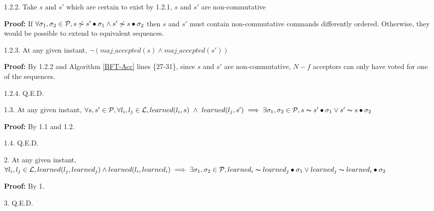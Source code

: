 \indent\indent\indent\indent\indent\parbox{\linewidth-\algorithmicindent*5}{\strut1.2.2. Take $s$ and $s'$ which are certain to exist by 1.2.1, $s$ and $s'$ are non-commutative }\par
\indent\indent\indent\indent\indent\indent\parbox{\linewidth-\algorithmicindent*6}{\strut\textbf{Proof:} If $\forall \sigma_1,\sigma_2 \in \mathcal{P}, s \not\thicksim s' \bullet \sigma_1 \land s' \not\thicksim s \bullet \sigma_2$ then $s$ and $s'$ must contain non-commutative commands differently ordered. Otherwise, they would be possible to extend to equivalent sequences.}\par
\indent\indent\indent\indent\indent\parbox{\linewidth}{\strut1.2.3. At any given instant, $\neg (maj\_accepted(s) \land maj\_accepted(s'))$ } \par
\indent\indent\indent\indent\indent\indent\parbox{\linewidth-\algorithmicindent*6}{\strut\textbf{Proof:} By 1.2.2 and Algorithm \ref{BFT-Acc} lines \{27-31\}, since $s$ and $s'$ are non-commutative, $N-f$ acceptors can only have voted for one of the sequences.}\par
\indent\indent\indent\indent\indent\parbox{\linewidth}{\strut1.2.4. Q.E.D. }\par
\indent\indent\indent\parbox{\linewidth-\algorithmicindent*3}{\strut1.3. At any given instant, $\forall s,s' \in \mathcal{P}, \forall l_i,l_j \in \mathcal{L}, learned(l_i,s)\ \land\ learned(l_j,s') \implies \exists \sigma_1,\sigma_2 \in \mathcal{P}, s \thicksim s' \bullet \sigma_1 \lor s' \thicksim s \bullet \sigma_2$ }\par
\indent\indent\indent\indent\parbox{\linewidth}{\strut\textbf{Proof:} By 1.1 and 1.2.}\par
\indent\indent\indent\parbox{\linewidth}{\strut1.4. Q.E.D. }\par
\parbox{\linewidth-\algorithmicindent*3}{\strut2. At any given instant, $\forall l_i,l_j \in \mathcal{L}, learned(l_j,learned_j) \land learned(l_i,learned_i) \implies \exists \sigma_1,\sigma_2 \in \mathcal{P}, learned_i \thicksim learned_j \bullet \sigma_1 \lor learned_j \thicksim learned_i \bullet \sigma_2$}\par
\indent\indent\parbox{\linewidth}{\strut\textbf{Proof:} By 1.}\par
\parbox{\linewidth}{\strut3. Q.E.D.} \par

